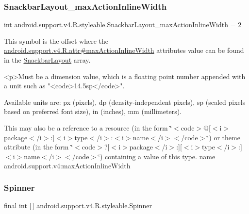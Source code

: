 \subsubsection{\texorpdfstring{Snackbar\+Layout\+\_\+max\+Action\+Inline\+Width}{SnackbarLayout\_maxActionInlineWidth}}
{\footnotesize\ttfamily int android.\+support.\+v4.\+R.\+styleable.\+Snackbar\+Layout\+\_\+max\+Action\+Inline\+Width = 2\hspace{0.3cm}{\ttfamily [static]}}

This symbol is the offset where the \hyperlink{classandroid_1_1support_1_1v4_1_1R_1_1attr_abbf94baaafc982699ebdb3912a8c0a65}{android.\+support.\+v4.\+R.\+attr\#max\+Action\+Inline\+Width} attribute\textquotesingle{}s value can be found in the \hyperlink{classandroid_1_1support_1_1v4_1_1R_1_1styleable_adeacc34656ceb21bac2e2f80c4437fbc}{Snackbar\+Layout} array.

\begin{DoxyVerb}      <p>Must be a dimension value, which is a floating point number appended with a unit such as "<code>14.5sp</code>".
\end{DoxyVerb}
 Available units are\+: px (pixels), dp (density-\/independent pixels), sp (scaled pixels based on preferred font size), in (inches), mm (millimeters). 

This may also be a reference to a resource (in the form \char`\"{}$<$code$>$@\mbox{[}$<$i$>$package$<$/i$>$\+:\mbox{]}$<$i$>$type$<$/i$>$\+:$<$i$>$name$<$/i$>$$<$/code$>$\char`\"{}) or theme attribute (in the form \char`\"{}$<$code$>$?\mbox{[}$<$i$>$package$<$/i$>$\+:\mbox{]}\mbox{[}$<$i$>$type$<$/i$>$\+:\mbox{]}$<$i$>$name$<$/i$>$$<$/code$>$\char`\"{}) containing a value of this type.  name android.\+support.\+v4\+:max\+Action\+Inline\+Width \mbox{\label{classandroid_1_1support_1_1v4_1_1R_1_1styleable_a34e1edd521133711195b551c5477c69d}} 
\subsubsection{\texorpdfstring{Spinner}{Spinner}}
{\footnotesize\ttfamily final int \mbox{[}$\,$\mbox{]} android.\+support.\+v4.\+R.\+styleable.\+Spinner\hspace{0.3cm}{\ttfamily [static]}}

